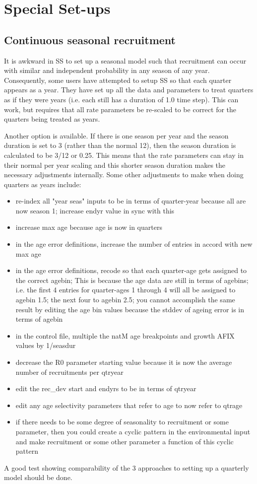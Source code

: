 \section{Special Set-ups}

\subsection{Continuous seasonal recruitment}
It is awkward in SS to set up a seasonal model such that recruitment can occur with similar and independent probability in any season of any year.  Consequently, some users have attempted to setup SS so that each quarter appears as a year.  They have set up all the data and parameters to treat quarters as if they were years (i.e. each still has a duration of 1.0 time step).  This can work, but requires that all rate parameters be re-scaled to be correct for the quarters being treated as years.

Another option is available.  If there is one season per year and the season duration is set to 3 (rather than the normal 12), then the season duration is calculated to be 3/12 or 0.25.  This means that the rate parameters can stay in their normal per year scaling and this shorter season duration makes the necessary adjustments internally.  Some other adjustments to make when doing quarters as years include:

\begin{itemize}
	\item re-index all "year seas" inputs to be in terms of quarter-year because all are now season 1; increase endyr value in sync with this
	\item increase max age because age is now in quarters
	\item in the age error definitions, increase the number of entries in accord with new max age
	\item in the age error definitions, recode so that each quarter-age gets assigned to the correct agebin;  This is because the age data are still in terms of agebins; i.e. the first 4 entries for quarter-ages 1 through 4 will all be assigned to agebin 1.5; the next four to agebin 2.5;  you cannot accomplish the same result by editing the age bin values because the stddev of ageing error is in terms of agebin
	\item in the control file, multiple the natM age breakpoints  and growth AFIX values by 1/seasdur
	\item decrease the R0 parameter starting value because it is now the average number of recruitments per qtryear
	\item edit the rec\_dev start and endyrs to be in terms of qtryear
	\item edit any age selectivity parameters that refer to age to now refer to qtrage
	\item if there needs to be some degree of seasonality to recruitment or some parameter, then you could create a cyclic pattern in the environmental input and make recruitment or some other parameter a function of this cyclic pattern
\end{itemize}
	
A good test showing comparability of the 3 approaches to setting up a quarterly model should be done.

